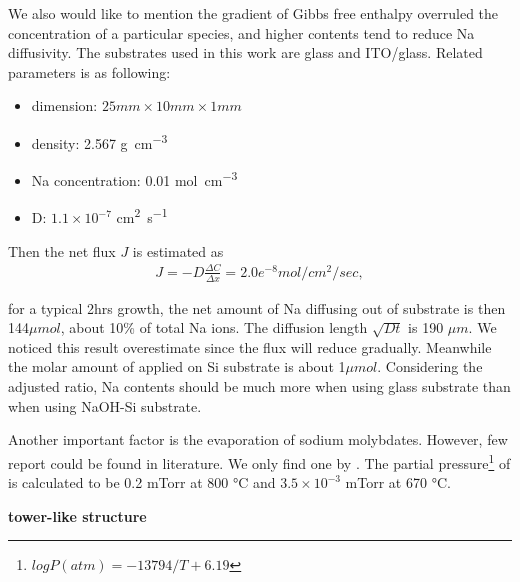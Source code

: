 We also would like to mention the gradient of Gibbs free enthalpy overruled the concentration of a particular species, and higher  contents tend to reduce Na diffusivity.\cite{Materials2012}  The substrates used in this work are glass and ITO/glass. Related parameters is as following:
\begin{itemize}
\item dimension: $25mm\times10mm\times1mm$
\item density: 2.567 \si{g\per cm^3}
\item Na concentration: 0.01 \si{mol\per cm^3}
\item D: $1.1\times10^{-7}$ \si{cm^2\per\second}
\end{itemize}

Then the net flux $J$ is estimated as
\begin{align}
J = -D \frac{\Delta C}{\Delta x} = 2.0e^{-8} mol/cm^2/sec,
\end{align}

for a typical 2hrs growth, the net amount of Na diffusing out of substrate is then 144$\mu mol$, about 10\% of total Na ions. The diffusion length $\sqrt{Dt}$ is 190 $\mu m$. We noticed this result overestimate since the flux will reduce gradually. Meanwhile the molar amount of  applied on Si substrate is about 1$\mu mol$. Considering the adjusted ratio, Na contents should be much more when using glass substrate than when using NaOH-Si substrate.

Another important factor is the evaporation of sodium molybdates. However, few report could be found in literature. We only find one by \citeauthor{Kazenas2010}.\cite{Kazenas2010} The partial pressure\footnote{$logP(atm)= -13794/T + 6.19$} of  is calculated to be 0.2 mTorr at 800 \si{\degreeCelsius} and $3.5\times 10^{-3}$ mTorr at 670 \si{\degreeCelsius}.

\textbf{tower-like structure}

